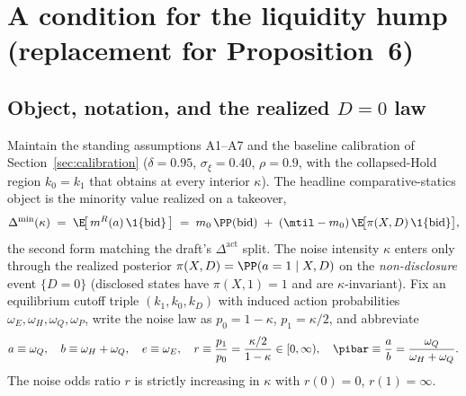 \makeatletter
{}
\makeatother


\section{A condition for the liquidity hump (replacement for Proposition~6)}
\label{sec:prop6-Cstarstar}

\subsection*{Object, notation, and the realized \texorpdfstring{$D=0$}{D=0} law}

Maintain the standing assumptions A1--A7 and the baseline calibration of
Section~\ref{sec:calibration} ($\delta=0.95$, $\sigma_\xi=0.40$, $\rho=0.9$,
with the collapsed-Hold region $k_0=k_1$ that obtains at every interior
$\kappa$). The headline comparative-statics object is the minority value
realized on a takeover,
\begin{equation}
  \Delta^{\min}(\kappa)
  \;=\;\E\!\big[\,m^{R}(a)\,\1\{\text{bid}\}\,\big]
  \;=\; m_0\,\PP(\text{bid})\;+\;(\mtil-m_0)\,
        \E\!\big[\pi(X,D)\,\1\{\text{bid}\}\big],
  \label{eq:Dmin-def}
\end{equation}
the second form matching the draft's $\Delta^{\mathrm{act}}$ split. The noise
intensity $\kappa$ enters only through the realized posterior
$\pi(X,D)=\PP(a=1\mid X,D)$ on the \emph{non-disclosure} event $\{D=0\}$
(disclosed states have $\pi(X,1)=1$ and are $\kappa$-invariant). Fix an
equilibrium cutoff triple $(k_1,k_0,k_D)$ with induced action probabilities
$\omega_E,\omega_H,\omega_Q,\omega_P$, write the noise law as
$p_0=1-\kappa$, $p_1=\kappa/2$, and abbreviate
\begin{equation}
  a\equiv\omega_Q,\quad b\equiv\omega_H+\omega_Q,\quad e\equiv\omega_E,
  \quad r\equiv\frac{p_1}{p_0}=\frac{\kappa/2}{1-\kappa}\in[0,\infty),
  \quad \pibar\equiv\frac{a}{b}=\frac{\omega_Q}{\omega_H+\omega_Q}.
  \label{eq:abbrev}
\end{equation}
The noise odds ratio $r$ is strictly increasing in $\kappa$ with $r(0)=0$,
$r(1)=\infty$.

